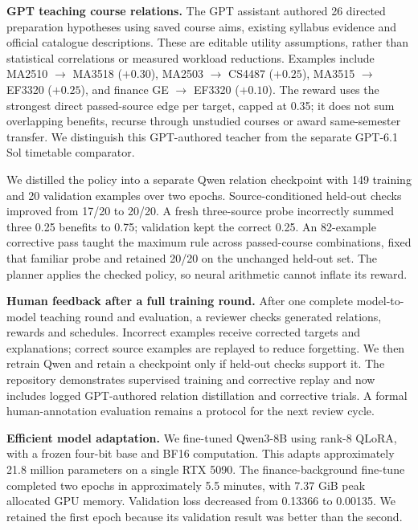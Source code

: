 \documentclass{article}
\begin{document}
\begin{samepage}
\textbf{GPT teaching course relations.} The GPT assistant authored 26 directed preparation hypotheses using saved course aims, existing syllabus evidence and official catalogue descriptions. These are editable utility assumptions, rather than statistical correlations or measured workload reductions. Examples include MA2510 $\rightarrow$ MA3518 ($+0.30$), MA2503 $\rightarrow$ CS4487 ($+0.25$), MA3515 $\rightarrow$ EF3320 ($+0.25$), and finance GE $\rightarrow$ EF3320 ($+0.10$). The reward uses the strongest direct passed-source edge per target, capped at 0.35; it does not sum overlapping benefits, recurse through unstudied courses or award same-semester transfer. We distinguish this GPT-authored teacher from the separate GPT-6.1 Sol timetable comparator.

We distilled the policy into a separate Qwen relation checkpoint with 149 training and 20 validation examples over two epochs. Source-conditioned held-out checks improved from 17/20 to 20/20. A fresh three-source probe incorrectly summed three 0.25 benefits to 0.75; validation kept the correct 0.25. An 82-example corrective pass taught the maximum rule across passed-course combinations, fixed that familiar probe and retained 20/20 on the unchanged held-out set. The planner applies the checked policy, so neural arithmetic cannot inflate its reward.

\end{samepage}

\textbf{Human feedback after a full training round.} After one complete model-to-model teaching round and evaluation, a reviewer checks generated relations, rewards and schedules. Incorrect examples receive corrected targets and explanations; correct source examples are replayed to reduce forgetting. We then retrain Qwen and retain a checkpoint only if held-out checks support it. The repository demonstrates supervised training and corrective replay and now includes logged GPT-authored relation distillation and corrective trials. A formal human-annotation evaluation remains a protocol for the next review cycle.

\textbf{Efficient model adaptation.} We fine-tuned Qwen3-8B\citep{qwen} using rank-8 QLoRA\citep{qlora}, with a frozen four-bit base and BF16 computation. This adapts approximately 21.8 million parameters on a single RTX 5090. The finance-background fine-tune completed two epochs in approximately 5.5 minutes, with 7.37 GiB peak allocated GPU memory. Validation loss decreased from 0.13366 to 0.00135. We retained the first epoch because its validation result was better than the second.
\end{document}
